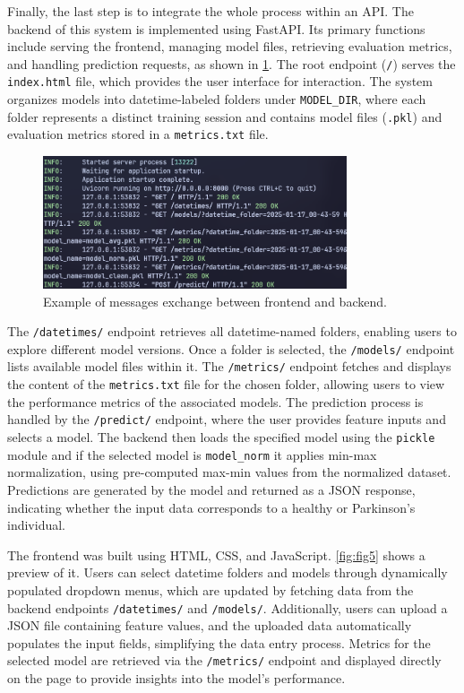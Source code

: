 Finally, the last step is to integrate the whole process within an API. The
backend of this system is implemented using FastAPI. Its primary functions
include serving the frontend, managing model files, retrieving evaluation
metrics, and handling prediction requests, as shown in \cref{fig:fig4}. The
root endpoint (\texttt{/}) serves the \texttt{index.html} file, which provides
the user interface for interaction. The system organizes models into
datetime-labeled folders under \texttt{MODEL\_DIR}, where each folder
represents a distinct training session and contains model files (\texttt{.pkl})
and evaluation metrics stored in a \texttt{metrics.txt} file.

\begin{figure}[H]
	\centering
	\includegraphics[width=0.80\textwidth,
		height=0.23\textheight]{../images/api/backend.png}
	\caption{Example of messages exchange between frontend and backend.}
	\label{fig:fig4}
\end{figure}

The \texttt{/datetimes/} endpoint retrieves all datetime-named folders,
enabling users to explore different model versions. Once a folder is selected,
the \texttt{/models/} endpoint lists available model files within it. The
\texttt{/metrics/} endpoint fetches and displays the content of the
\texttt{metrics.txt} file for the chosen folder, allowing users to view the
performance metrics of the associated models. The prediction process is handled
by the \texttt{/predict/} endpoint, where the user provides feature inputs and
selects a model. The backend then loads the specified model using the
\texttt{pickle} module and if the selected model is \texttt{model\_norm} it
applies min-max normalization, using pre-computed max-min values from the
normalized dataset. Predictions are generated by the model and returned as a
JSON response, indicating whether the input data corresponds to a healthy or
Parkinson's individual.

The frontend was built using HTML, CSS, and JavaScript. \cref{fig:fig5} shows a
preview of it. Users can select datetime folders and models through dynamically
populated dropdown menus, which are updated by fetching data from the backend
endpoints \texttt{/datetimes/} and \texttt{/models/}. Additionally, users can
upload a JSON file containing feature values, and the uploaded data
automatically populates the input fields, simplifying the data entry process.
Metrics for the selected model are retrieved via the \texttt{/metrics/}
endpoint and displayed directly on the page to provide insights into the
model's performance.

